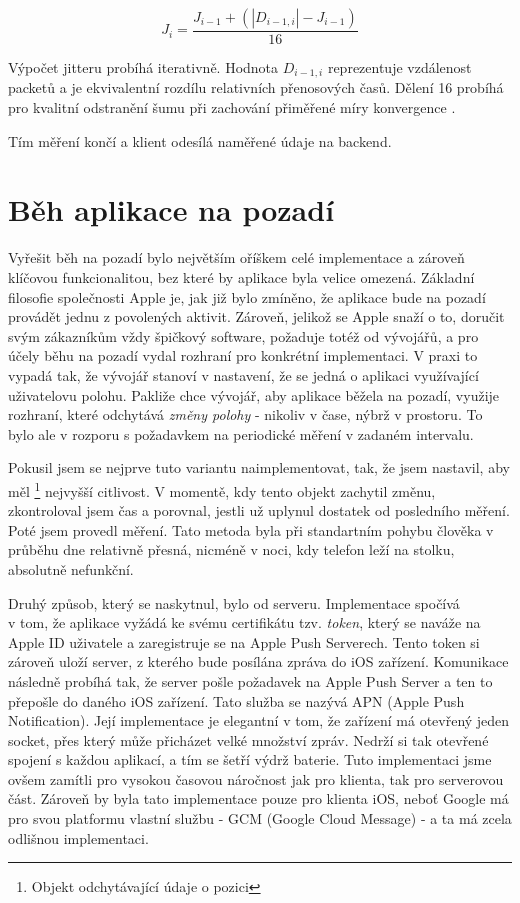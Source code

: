 $$ J_i = \frac{J_{i-1} + (|D_{i-1,i}| - J_{i-1})}{16} $$

Výpočet jitteru probíhá iterativně. Hodnota $D_{i-1,i}$ reprezentuje vzdálenost packetů a je ekvivalentní rozdílu relativních přenosových časů. Dělení 16 probíhá pro kvalitní odstranění šumu při zachování přiměřené míry konvergence \cite{JIT}.

Tím měření končí a klient odesílá naměřené údaje na backend.

\section{Běh aplikace na pozadí}
Vyřešit běh na pozadí bylo největším oříškem celé implementace a zároveň klíčovou funkcionalitou, bez které by aplikace byla velice omezená. Základní filosofie společnosti Apple je, jak již bylo zmíněno, že aplikace bude na pozadí provádět jednu z povolených aktivit. Zároveň, jelikož se Apple snaží o to, doručit svým zákazníkům vždy špičkový software, požaduje totéž od vývojářů, a pro účely běhu na pozadí vydal rozhraní pro konkrétní implementaci. V praxi to vypadá tak, že vývojář stanoví v nastavení, že se jedná o aplikaci využívající uživatelovu polohu. Pakliže chce vývojář, aby aplikace běžela na pozadí, využije rozhraní, které odchytává \emph{změny polohy} - nikoliv v čase, nýbrž v prostoru. To bylo ale v rozporu s požadavkem na periodické měření v zadaném intervalu. 

Pokusil jsem se nejprve tuto variantu naimplementovat, tak, že jsem nastavil, aby měl \footnote{Objekt odchytávající údaje o pozici} nejvyšší citlivost. V momentě, kdy tento objekt zachytil změnu, zkontroloval jsem čas a porovnal, jestli už uplynul dostatek od posledního měření. Poté jsem provedl měření. Tato metoda byla při standartním pohybu člověka v průběhu dne relativně přesná, nicméně v noci, kdy telefon leží na stolku, absolutně nefunkční.

Druhý způsob, který se naskytnul, bylo  od serveru. Implementace spočívá \\v tom, že aplikace vyžádá ke svému certifikátu tzv. \emph{token}, který se naváže na Apple ID uživatele a zaregistruje se na Apple Push Serverech. Tento token si zároveň uloží server, z kterého bude posílána zpráva do iOS zařízení. Komunikace následně probíhá tak, že server pošle požadavek na Apple Push Server a ten to přepošle do daného iOS zařízení. Tato služba se nazývá APN (Apple Push Notification). Její implementace je elegantní v tom, že zařízení má otevřený jeden socket, přes který může přicházet velké množství zpráv. Nedrží si tak otevřené spojení s každou aplikací, a tím se šetří výdrž baterie. Tuto implementaci jsme ovšem zamítli pro vysokou časovou náročnost jak pro klienta, tak pro serverovou část. Zároveň by byla tato implementace pouze pro klienta iOS, neboť Google má pro svou platformu vlastní službu - GCM (Google Cloud Message) - a ta má zcela odlišnou implementaci.

